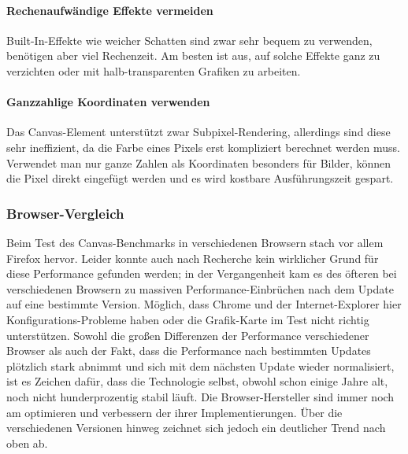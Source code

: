\documentclass[a4paper, 12pt]{article}
\begin{document}
\paragraph{Rechenaufwändige Effekte vermeiden} Built-In-Effekte wie weicher Schatten sind zwar sehr bequem zu verwenden, benötigen aber viel Rechenzeit. Am besten ist aus, auf solche Effekte ganz zu verzichten oder mit halb-transparenten Grafiken zu arbeiten.
\paragraph{Ganzzahlige Koordinaten verwenden} Das Canvas-Element unterstützt zwar Subpixel-Rendering, allerdings sind diese sehr ineffizient, da die Farbe eines Pixels erst kompliziert berechnet werden muss. Verwendet man nur ganze Zahlen als Koordinaten besonders für Bilder, können die Pixel direkt eingefügt werden und es wird kostbare Ausführungszeit gespart.
\newpage
\subsubsection{Browser-Vergleich} Beim Test des Canvas-Benchmarks in verschiedenen Browsern stach vor allem Firefox hervor. Leider konnte auch nach Recherche kein wirklicher Grund für diese Performance gefunden werden; in der Vergangenheit kam es des öfteren bei verschiedenen Browsern zu massiven Performance-Einbrüchen nach dem Update auf eine bestimmte Version. Möglich, dass Chrome und der Internet-Explorer hier Konfigurations-Probleme haben oder die Grafik-Karte im Test nicht richtig unterstützen.
Sowohl die großen Differenzen der Performance verschiedener Browser als auch der Fakt, dass die Performance nach bestimmten Updates plötzlich stark abnimmt und sich mit dem nächsten Update wieder normalisiert, ist es Zeichen dafür, dass die Technologie selbst, obwohl schon einige Jahre alt, noch nicht hunderprozentig stabil läuft. Die Browser-Hersteller sind immer noch am optimieren und verbessern der ihrer Implementierungen. Über die verschiedenen Versionen hinweg zeichnet sich jedoch ein deutlicher Trend nach oben ab.
\end{document}
